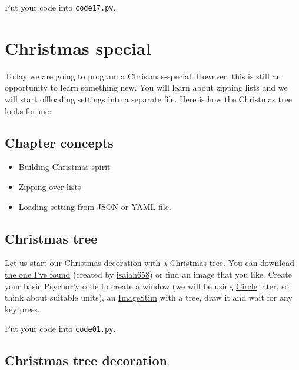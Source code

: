 \documentclass[
]{book}
\providecommand{\tightlist}{%
  \setlength{\itemsep}{0pt}\setlength{\parskip}{0pt}}
\begin{document}
Put your code into \texttt{code17.py}.

\hypertarget{christmas-special}{%
\chapter{Christmas special}\label{christmas-special}}

Today we are going to program a Christmas-special. However, this is still an opportunity to learn something new. You will learn about zipping lists and we will start offloading settings into a separate file. Here is how the Christmas tree looks for me:

\hypertarget{chapter-concepts-6}{%
\section{Chapter concepts}\label{chapter-concepts-6}}

\begin{itemize}
\tightlist
\item
  Building Christmas spirit
\item
  Zipping over lists
\item
  Loading setting from JSON or YAML file.
\end{itemize}

\hypertarget{christmas-tree}{%
\section{Christmas tree}\label{christmas-tree}}

Let us start our Christmas decoration with a Christmas tree. You can download \href{material/pine-tree.png}{the one I've found} (created by \href{https://openclipart.org/artist/isaiah658}{isaiah658}) or find an image that you like. Create your basic PsychoPy code to create a window (we will be using \href{https://psychopy.org/api/visual/circle.html\#psychopy.visual.circle.Circle}{Circle} later, so think about suitable units), an \href{https://psychopy.org/api/visual/imagestim.html\#psychopy.visual.ImageStim}{ImageStim} with a tree, draw it and wait for any key press.

Put your code into \texttt{code01.py}.

\hypertarget{christmas-tree-decoration}{%
\section{Christmas tree decoration}\label{christmas-tree-decoration}}
\end{document}
